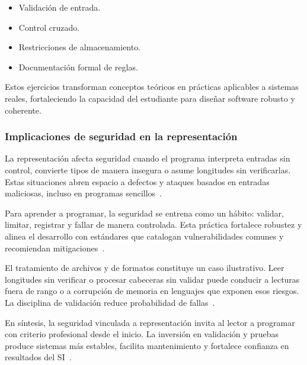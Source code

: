 \documentclass[12pt,twoside]{book}
\begin{document}
						\begin{itemize}
							\item Validación de entrada.
							\item Control cruzado.
							\item Restricciones de almacenamiento.
							\item Documentación formal de reglas.
						\end{itemize}
						
						Estos ejercicios transforman conceptos teóricos en prácticas aplicables a sistemas reales, fortaleciendo la capacidad del estudiante para diseñar software robusto y coherente.
						
					\subsubsection{Implicaciones de seguridad en la representación}
					\noindent
						La representación afecta seguridad cuando el programa interpreta entradas sin control, convierte tipos de manera insegura o asume longitudes sin verificarlas. Estas situaciones abren espacio a defectos y ataques basados en entradas maliciosas, incluso en programas sencillos~\cite{ISO247722024Programming,Pressman2019Software,Ghezzi2003Fundamentals}.
						
						Para aprender a programar, la seguridad se entrena como un hábito: validar, limitar, registrar y fallar de manera controlada. Esta práctica fortalece robustez y alinea el desarrollo con estándares que catalogan vulnerabilidades comunes y recomiendan mitigaciones~\cite{ISO247722024Programming,Sommerville2015Software,Hanly2015Problem}.
						
						El tratamiento de archivos y de formatos constituye un caso ilustrativo. Leer longitudes sin verificar o procesar cabeceras sin validar puede conducir a lecturas fuera de rango o a corrupción de memoria en lenguajes que exponen esos riesgos. La disciplina de validación reduce probabilidad de fallas~\cite{Silberschatz2018Operating,Tanenbaum2021Structured,ISO247722024Programming}.
						
						En síntesis, la seguridad vinculada a representación invita al lector a programar con criterio profesional desde el inicio. La inversión en validación y pruebas produce sistemas más estables, facilita mantenimiento y fortalece confianza en resultados del SI~\cite{Pressman2019Software,Ghezzi2003Fundamentals,Laudon2020Management}.
						
\end{document}
